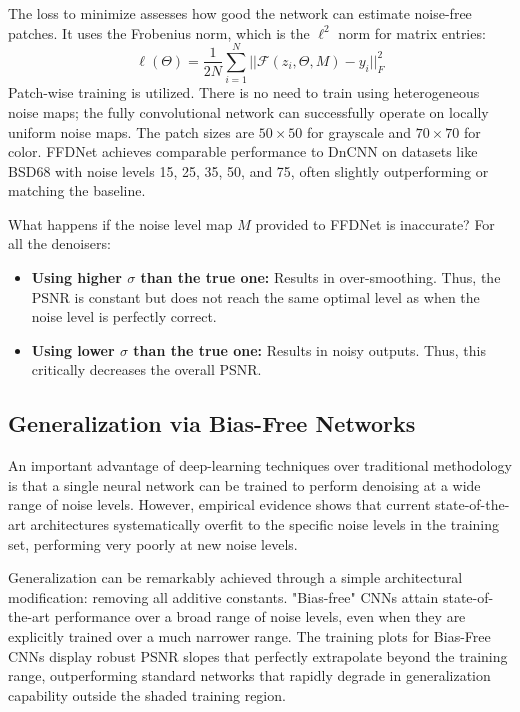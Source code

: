 The loss to minimize assesses how good the network can estimate noise-free patches. It uses the Frobenius norm, which is the $\ell^2$ norm for matrix entries:
\begin{equation}
    \ell(\Theta) = \frac{1}{2N} \sum_{i=1}^N || \mathcal{F}(z_i, \Theta, M) - y_i ||_F^2
\end{equation}
Patch-wise training is utilized. There is no need to train using heterogeneous noise maps; the fully convolutional network can successfully operate on locally uniform noise maps. The patch sizes are $50 \times 50$ for grayscale and $70 \times 70$ for color. FFDNet achieves comparable performance to DnCNN on datasets like BSD68 with noise levels 15, 25, 35, 50, and 75, often slightly outperforming or matching the baseline.

\begin{insightbox}
What happens if the noise level map $M$ provided to FFDNet is inaccurate?
For all the denoisers:
\begin{itemize}
    \item \textbf{Using higher $\sigma$ than the true one:} Results in over-smoothing. Thus, the PSNR is constant but does not reach the same optimal level as when the noise level is perfectly correct.
    \item \textbf{Using lower $\sigma$ than the true one:} Results in noisy outputs. Thus, this critically decreases the overall PSNR.
\end{itemize}
\end{insightbox}

\subsection{Generalization via Bias-Free Networks}
An important advantage of deep-learning techniques over traditional methodology is that a single neural network can be trained to perform denoising at a wide range of noise levels. However, empirical evidence shows that current state-of-the-art architectures systematically overfit to the specific noise levels in the training set, performing very poorly at new noise levels. 

Generalization can be remarkably achieved through a simple architectural modification: removing all additive constants. "Bias-free" CNNs attain state-of-the-art performance over a broad range of noise levels, even when they are explicitly trained over a much narrower range. The training plots for Bias-Free CNNs display robust PSNR slopes that perfectly extrapolate beyond the training range, outperforming standard networks that rapidly degrade in generalization capability outside the shaded training region.

